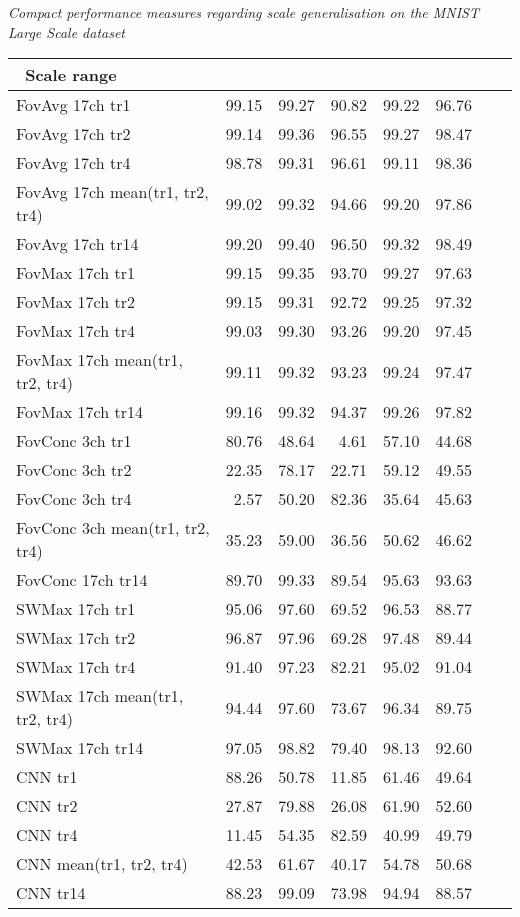 \documentclass[twocolumn,runningheads]{svjour3}
\begin{document}
\begin{table*}[tp]
\setlength{\tabcolsep}{6pt} \begin{center}
  {\em Compact performance measures regarding scale generalisation on
    the MNIST Large Scale dataset}

  \medskip

\begin{tabular}{l r r r r r r r}
\hline
\ Scale range &  &   &  &  &   \\ 
\hline
FovAvg 17ch tr1  &  99.15 & 99.27 & 90.82 & 99.22 & 96.76\\
FovAvg 17ch tr2  &  99.14 & 99.36 & 96.55 & 99.27 & 98.47\\
FovAvg 17ch tr4  &  98.78 & 99.31 & 96.61 & 99.11 & 98.36\\
FovAvg 17ch mean(tr1, tr2, tr4)  &  99.02 & 99.32 & 94.66 & 99.20 & 97.86\\
FovAvg 17ch tr14  &  99.20 & 99.40 & 96.50 & 99.32 & 98.49\\
\hline
FovMax 17ch tr1  &  99.15 & 99.35 & 93.70 & 99.27 & 97.63\\
FovMax 17ch tr2  &  99.15 & 99.31 & 92.72 & 99.25 & 97.32\\
FovMax 17ch tr4  &  99.03 & 99.30 & 93.26 & 99.20 & 97.45\\
FovMax 17ch mean(tr1, tr2, tr4)  &  99.11 & 99.32 & 93.23 & 99.24 & 97.47\\
FovMax 17ch tr14  &  99.16 & 99.32 & 94.37 & 99.26 & 97.82\\
\hline
FovConc 3ch tr1  &  80.76 & 48.64 & 4.61 & 57.10 & 44.68\\
FovConc 3ch tr2  &  22.35 & 78.17 & 22.71 & 59.12 & 49.55\\
FovConc 3ch tr4  &  2.57 & 50.20 & 82.36 & 35.64 & 45.63\\
FovConc 3ch mean(tr1, tr2, tr4)  &  35.23 & 59.00 & 36.56 & 50.62 & 46.62\\
FovConc 17ch tr14  &  89.70 & 99.33 & 89.54 & 95.63 & 93.63\\
\hline
SWMax 17ch tr1  &  95.06 & 97.60 & 69.52 & 96.53 & 88.77\\
SWMax 17ch tr2  &  96.87 & 97.96 & 69.28 & 97.48 & 89.44\\
SWMax 17ch tr4  &  91.40 & 97.23 & 82.21 & 95.02 & 91.04\\
SWMax 17ch mean(tr1, tr2, tr4)  &  94.44 & 97.60 & 73.67 & 96.34 & 89.75\\
SWMax 17ch tr14  &  97.05 & 98.82 & 79.40 & 98.13 & 92.60\\
\hline
CNN tr1  &  88.26 & 50.78 & 11.85 & 61.46 & 49.64\\
CNN tr2  &  27.87 & 79.88 & 26.08 & 61.90 & 52.60\\
CNN tr4  &  11.45 & 54.35 & 82.59 & 40.99 & 49.79\\
CNN mean(tr1, tr2, tr4)  &  42.53 & 61.67 & 40.17 & 54.78 & 50.68\\
CNN tr14  &  88.23 & 99.09 & 73.98 & 94.94 & 88.57\\
  \hline
\end{tabular}
\end{center}


\end{table*}
\end{document}
